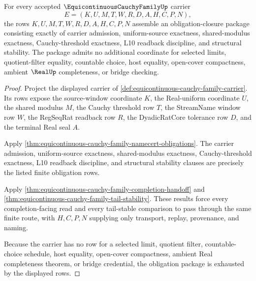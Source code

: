 \begin{theorem}
\label{thm:equicontinuous-cauchy-family-obligation-closure-package}
For every accepted $\EquicontinuousCauchyFamilyUp$ carrier
$$
E=(K,U,M,T,W,R,D,A,H,C,P,N),
$$
the rows $K,U,M,T,W,R,D,A,H,C,P,N$ assemble an obligation-closure package consisting exactly of carrier admission, uniform-source exactness, shared-modulus exactness, Cauchy-threshold exactness, L10 readback discipline, and structural stability. The package admits no additional coordinate for selected limits, quotient-filter equality, countable choice, host equality, open-cover compactness, ambient $\RealUp$ completeness, or bridge checking.
\end{theorem}
\begin{proof}
Project the displayed carrier of \autoref{def:equicontinuous-cauchy-family-carrier}. Its rows expose the source-window coordinate $K$, the Real-uniform coordinate $U$, the shared modulus $M$, the Cauchy threshold row $T$, the StreamName window row $W$, the RegSeqRat readback row $R$, the DyadicRatCore tolerance row $D$, and the terminal Real seal $A$.

Apply \autoref{thm:equicontinuous-cauchy-family-namecert-obligations}. The carrier admission, uniform-source exactness, shared-modulus exactness, Cauchy-threshold exactness, L10 readback discipline, and structural stability clauses are precisely the listed finite obligation rows.

Apply \autoref{thm:equicontinuous-cauchy-family-completion-handoff} and \autoref{thm:equicontinuous-cauchy-family-tail-stability}. These results force every completion-facing read and every tail-stable comparison to pass through the same finite route, with $H,C,P,N$ supplying only transport, replay, provenance, and naming.

Because the carrier has no row for a selected limit, quotient filter, countable-choice schedule, host equality, open-cover compactness, ambient Real completeness theorem, or bridge credential, the obligation package is exhausted by the displayed rows.
\end{proof}

